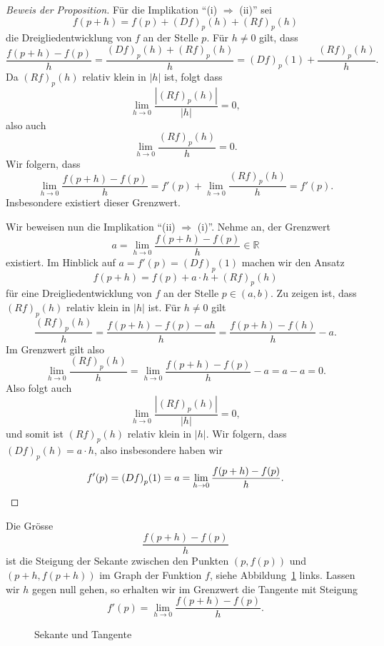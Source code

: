 \documentclass[../main.tex]{subfiles}
\begin{document}
\begin{proof}[Beweis der Proposition]
  Für die Implikation ``(i) $\Rightarrow$ (ii)''
  sei
  \[
    f(p + h) = f(p) + {(Df)}_p(h) + {(Rf)}_p(h)
  \]
  die Dreigliedentwicklung von $f$ an der
  Stelle $p$.
  Für $h \neq 0$ gilt, dass
  \[
    \frac{f(p + h) - f(p)}{h}
    = \frac{{(Df)}_p(h) + {(Rf)}_p(h)}{h}
    ={(Df)}_p(1) + \frac{{(Rf)}_p(h)}{h}.
  \]
  Da ${(Rf)}_p(h)$ relativ klein in $|h|$ ist,
  folgt dass
  \[
    \lim_{h \to 0} \frac{|{(Rf)}_p(h)|}{|h|} = 0,
  \]
  also auch
  \[
    \lim_{h \to 0} \frac{{(Rf)}_p(h)}{h} = 0.
  \]
  Wir folgern, dass
  \[
    \lim_{h \to 0} \frac{f(p + h) - f(p)}{h}
    = f'(p) + \lim_{h \to 0} \frac{{(Rf)}_p(h)}{h} = f'(p).
  \]
  Insbesondere existiert dieser Grenzwert.

  Wir beweisen nun die Implikation
  ``(ii) $\Rightarrow$ (i)''.
  Nehme an, der Grenzwert
  \[
    a = \lim_{h \to 0} \frac{f(p+h) - f(p)}{h} \in \mathbb{R}
  \]
  existiert.
  Im Hinblick auf $a = f'(p) = {(Df)}_p(1)$
  machen wir den Ansatz
  \[
    f(p + h) = f(p) + a \cdot h + {(Rf)}_p(h)
  \]
  für eine Dreigliedentwicklung von $f$ an der Stelle
  $p \in (a, b)$. Zu zeigen ist, dass
  ${(Rf)}_p(h)$ relativ klein in $|h|$ ist.
  Für $h \neq 0$ gilt
  \[
    \frac{{(Rf)}_p(h)}{h} =
    \frac{f(p+h) - f(p) - ah}{h}
    = \frac{f(p+h) - f(h)}{h} - a.
  \]
  Im Grenzwert gilt also
  \[
    \lim_{h \to 0} \frac{{(Rf)}_p(h)}{h}
    = \lim_{h \to 0}
    \frac{f(p + h) - f(p)}{h} - a
    = a - a = 0.
  \]
  Also folgt auch
  \[
    \lim_{h \to 0} \frac{|{(Rf)}_p(h)|}{|h|} = 0,
  \]
  und somit ist ${(Rf)}_p(h)$ relativ klein
  in $|h|$.
  Wir folgern, dass ${(Df)}_p(h) = a \cdot h$,
  also insbesondere haben wir
  \[
    f'(p) = {(Df)}_p(1) = a = 
    \lim_{h \to 0} \frac{f(p + h) - f(p)}{h}. \qedhere
  \]
\end{proof}

\begin{geometric}
  Die Grösse
  \[
    \frac{f(p+h) - f(p)}{h}
  \]
  ist die Steigung der Sekante
  zwischen den Punkten $(p, f(p))$ 
  und $(p + h, f(p+h))$ im Graph
  der Funktion $f$, siehe Abbildung~\ref{fig:derivative}
  links.
  Lassen wir $h$ gegen null gehen,
  so erhalten wir im Grenzwert die Tangente
  mit Steigung
  \[
    f'(p) = \lim_{h \to 0} \frac{f(p + h) - f(p)}{h}.
  \]
\end{geometric}

\begin{figure}[htb] 
  \centering
  \begin{minipage}{0.4\textwidth}
    \centering
    
  \end{minipage}%
  \begin{minipage}{0.4\textwidth}
    \centering
    
  \end{minipage}%
  \caption{Sekante und Tangente}%
  \label{fig:derivative}
\end{figure}
\end{document}
